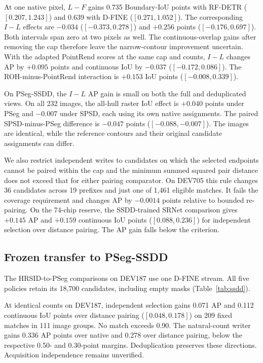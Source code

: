 \documentclass[journal]{IEEEtran}
\begin{document}
At one native pixel, \(L-F\) gains 0.735 Boundary-IoU points with RF-DETR (\([0.207,1.243]\)) and 0.639 with D-FINE (\([0.271,1.052]\)). The corresponding \(I-L\) effects are \(-0.034\) (\([-0.373,0.278]\)) and \(+0.256\) points (\([-0.176,0.697]\)). Both intervals span zero at two pixels as well. The continuous-overlap gains after removing the cap therefore leave the narrow-contour improvement uncertain. With the adapted PointRend scores at the same cap and counts, \(I-L\) changes AP by \(+0.095\) points and continuous IoU by \(-0.037\) (\([-0.172,0.086]\)). The ROH-minus-PointRend interaction is \(+0.153\) IoU points (\([-0.008,0.339]\)).

On PSeg-SSDD, the \(I-L\) AP gain is small on both the full and deduplicated views. On all 232 images, the all-hull raster IoU effect is \(+0.040\) points under PSeg and \(-0.007\) under SPSD, each using its own native assignments. The paired SPSD-minus-PSeg difference is \(-0.047\) points (\([-0.088,-0.007]\)). The images are identical, while the reference contours and their original candidate assignments can differ.

We also restrict independent writes to candidates on which the selected endpoints cannot be paired within the cap and the minimum summed squared pair distance does not exceed that for either pairing comparator. On DEV705 this rule changes 36 candidates across 19 prefixes and just one of 1,461 eligible matches. It fails the coverage requirement and changes AP by \(-0.0014\) points relative to bounded re-pairing. On the 74-chip reserve, the SSDD-trained SRNet comparison gives \(+0.145\) AP and \(+0.159\) continuous IoU points (\([0.088,0.236]\)) for independent selection over distance pairing. The AP gain falls below the criterion.

\subsection{Frozen transfer to PSeg-SSDD}
The HRSID-to-PSeg comparisons on DEV187 use one D-FINE stream. All five policies retain its 18,700 candidates, including empty masks (Table~\ref{tab:ssdd}).


At identical counts on DEV187, independent selection gains 0.071 AP and 0.112 continuous IoU points over distance pairing (\([0.048,0.178]\)) on 209 fixed matches in 111 image groups. No match exceeds 0.90. The natural-count writer gains 0.336 AP points over native and 0.278 over distance pairing, below the respective 0.50- and 0.30-point margins. Deduplication preserves these directions. Acquisition independence remains unverified.
\end{document}
